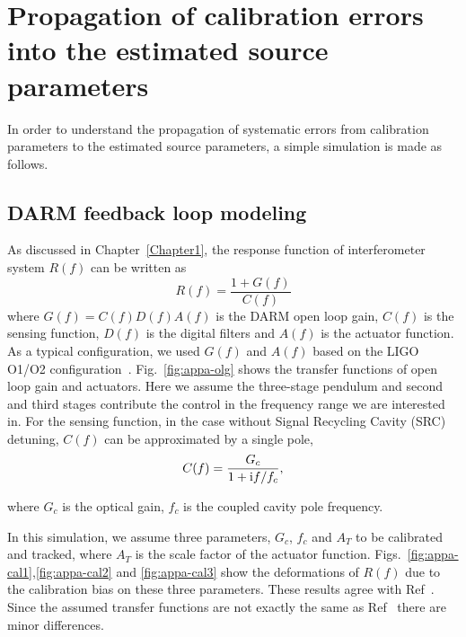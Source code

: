 
\chapter{Propagation of calibration errors into the estimated source 
parameters}
\label{AppendixA}

In order to understand the propagation of systematic errors from calibration 
parameters to the estimated source parameters, a simple simulation is made 
as follows.

\section{DARM feedback loop modeling}

As discussed in Chapter~\ref{Chapter1}, the response function of 
interferometer system $R(f)$ can be written as 
\begin{equation}
R(f) = \frac{1+G(f)}{C(f)}
\end{equation}
where $G(f) = C(f)D(f)A(f)$ is the DARM open loop gain, $C(f)$ is the sensing 
function, $D(f)$ is the digital filters and $A(f)$ is the actuator function.
As a typical configuration, we used $G(f)$ and $A(f)$ based on the LIGO O1/O2 
configuration~\cite{LIGO-CAL,Tuyenbayev}. Fig.~\ref{fig:appa-olg} shows the 
transfer functions of open loop gain and actuators. Here we assume the 
three-stage pendulum and second and third stages contribute the control 
in the frequency range we are interested in. For the sensing function, 
in the case without Signal Recycling Cavity (SRC) detuning, $C(f)$ 
can be approximated by a single pole,
\begin{equation}
C(f)=\frac{G_c}{1+{\rm i}f/f_c},
\end{equation}

where $G_c$ is the optical gain, $f_c$ is the coupled cavity pole frequency.

In this simulation, we assume three parameters, $G_c$, $f_c$ and $A_T$ 
to be calibrated and tracked, where $A_T$ is the scale factor of 
the actuator function. Figs.~\ref{fig:appa-cal1},\ref{fig:appa-cal2} and
\ref{fig:appa-cal3} show the deformations 
of $R(f)$ due to the calibration bias on these three parameters.
These results agree with Ref~\cite{Tuyenbayev}. Since the assumed 
transfer functions are not exactly the same as Ref~\cite{Tuyenbayev} 
there are minor differences.

